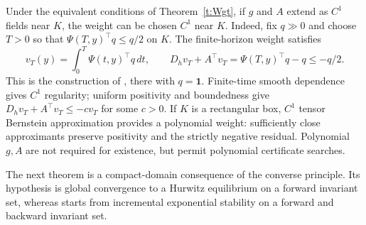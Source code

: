 Under the equivalent conditions of Theorem~\ref{t:Wgt}, if $g$ and $A$
extend as $C^1$ fields near $K$, the weight can be chosen $C^1$ near $K$.
Indeed, fix $q\gg0$ and choose $T>0$ so that
$\Psi(T,y)^\top q\le q/2$ on $K$. The finite-horizon weight satisfies
\[
 v_T(y)=\int_0^T\Psi(t,y)^\top q\,dt,\qquad
 D_hv_T+A^\top v_T=\Psi(T,y)^\top q-q\le-q/2.
\]
This is the construction of \cite[Appendix~B, (61)]{KawanoBesselinkCao2020}, there with
$q=\mathbf1$. Finite-time smooth dependence gives $C^1$ regularity; uniform positivity
and boundedness give $D_hv_T+A^\top v_T\le-cv_T$ for some $c>0$.
If $K$ is a rectangular box, $C^1$ tensor Bernstein approximation
provides a polynomial weight: sufficiently close approximants preserve
positivity and the strictly negative residual. Polynomial $g,A$ are
not required for existence, but permit polynomial certificate searches.
\eeR

The next theorem is a compact-domain consequence of the converse principle. Its hypothesis is
global convergence to a Hurwitz equilibrium on a forward invariant set, whereas
\cite[Theorem~4.3]{KawanoBesselinkCao2020} starts from incremental exponential stability on a
forward and backward invariant set.

